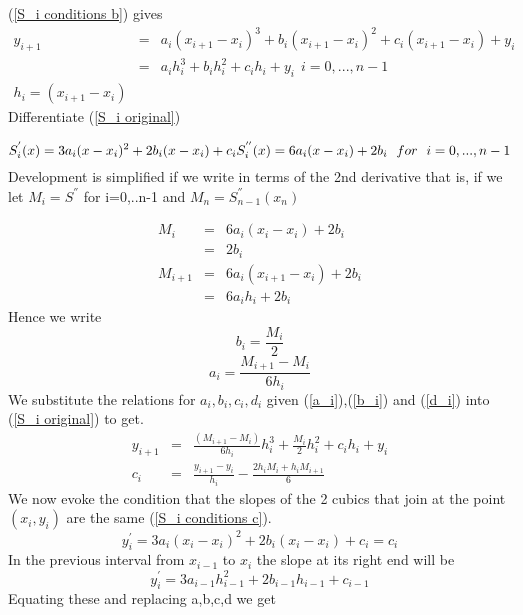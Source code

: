 (\ref{S_i conditions b}) gives
\begin{eqnarray*}
y_{i+1} &= &a_i(x_{i+1}-x_i)^3 + b_i(x_{i+1}-x_i)^2+c_i(x_{i+1}-x_i)+y_i \\
& = &  a_ih_i^3 + b_ih_i^2+c_ih_i+y_i \ \ i=0,...,n-1\\
h_i=(x_{i+1}-x_i)
\end{eqnarray*}
Differentiate (\ref{S_i original})

\begin{equation}
\label{S_i derivatives}
S_i^{'}(x) = 3a_i(x-x_i)^2 + 2b_i(x-x_i)+c_i\\
S_i^{''}(x) = 6a_i(x-x_i) + 2b_i \ \ for \ \ i=0,...,n-1\\
\end{equation}
Development is simplified if we write in terms of the 2nd derivative that is, if we let $M_i = S^{''}$ for i=0,..n-1 and $M_n = S_{n-1}^{''}(x_{n})$

\begin{eqnarray*}
M_i &=& 6a_i(x_i-x_i) + 2b_i\\
& = & 2 b_i \\
M_{i+1} &=& 6a_i(x_{i+1}-x_i) + 2b_i\\
& = &6a_ih_i+ 2 b_i
\end{eqnarray*}
Hence we write
\begin{equation}
\label{b_i}
b_i = \frac{M_i}{2}
\end{equation}
\begin{equation}
\label{a_i}
a_i = \frac{M_{i+1}- M_i}{6h_i}
\end{equation}
We substitute the relations for $a_i,b_i,c_i,d_i$ given (\ref{a_i}),(\ref{b_i}) and
(\ref{d_i}) into (\ref{S_i original}) to get.
\begin{eqnarray*}
y_{i+1} & = & \frac{(M_{i+1}-M_{i})}{6h_i}h^3_i + \frac{M_i}{2}h_i^2+c_ih_i+y_i \\
c_i & = & \frac{y_{i+1}-y_{i}}{h_i} - \frac{2h_iM_i+h_iM_{i+1}}{6} 
\end{eqnarray*}
We now evoke the condition that the slopes of the 2 cubics that join at the point $(x_i,y_i)$ are the same (\ref{S_i conditions c}).
\begin{equation*}
y_i^{'} = 3a_i(x_i-x_i)^2 + 2b_i(x_i-x_i)+c_i = c_i
\end{equation*}
In the previous interval from $x_{i-1}$ to $x_i$ the slope at its right end will
be 
\begin{equation*}
y_i^{'} = 3a_{i-1}h_{i-1}^2 + 2b_{i-1}h_{i-1}+c_{i-1} 
\end{equation*}
Equating these and replacing a,b,c,d we get

